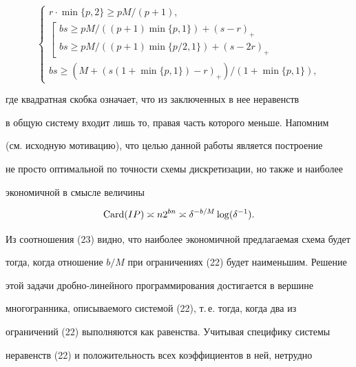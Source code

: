 \begin{pf}
\begin{equation}


\left\{


\begin{array}{l}


r\cdot\min\{p,2\} \ge pM/(p+1), \\


\left[


\begin{array}{l}


bs\ge pM/((p+1)\min\{p,1\}) + (s-r)_+  \\


bs\ge pM/((p+1)\min\{p/2,1\}) + (s-2r)_+


\end{array}  \right. \\


bs\ge (M+(s(1+\min\{p,1\})-r)_+)/(1+\min\{p,1\}),


\end{array}  \right.


\end{equation}


где квадратная скобка означает, что из заключенных в нее  неравенств


в общую систему входит лишь то, правая часть которого  меньше. Напомним


(см. исходную мотивацию), что целью данной работы является построение


не просто оптимальной по точности схемы дискретизации, но также и наиболее


экономичной в смысле величины


\begin{equation}


\Card(IP) \asymp n2^{bn} \asymp \delta^{-b/M}\log(\delta^{-1}) .


\end{equation}


Из соотношения (23) видно, что наиболее экономичной предлагаемая схема будет


тогда, когда отношение $b/M$ при ограничениях (22) будет наименьшим. Решение


этой задачи дробно-линейного программирования достигается в вершине


многогранника, описываемого системой (22), т.\,е. тогда, когда два из


ограничений (22) выполняются как равенства. Учитывая специфику системы


неравенств (22) и положительность всех коэффициентов в ней, нетрудно



\end{pf}
